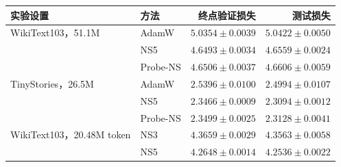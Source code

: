 \begin{tabular}{llrr}
\toprule
实验设置 & 方法 & 终点验证损失 & 测试损失 \\ \midrule
WikiText103，51.1M & AdamW & $5.0354\pm0.0039$ & $5.0422\pm0.0050$ \\
 & NS5 & $4.6493\pm0.0034$ & $4.6559\pm0.0024$ \\
 & Probe-NS & $4.6506\pm0.0037$ & $4.6606\pm0.0059$ \\
\addlinespace
TinyStories，26.5M & AdamW & $2.5396\pm0.0100$ & $2.4994\pm0.0107$ \\
 & NS5 & $2.3466\pm0.0009$ & $2.3094\pm0.0012$ \\
 & Probe-NS & $2.3499\pm0.0025$ & $2.3128\pm0.0041$ \\
\addlinespace
WikiText103，20.48M token & NS3 & $4.3659\pm0.0029$ & $4.3563\pm0.0058$ \\
 & NS5 & $4.2648\pm0.0014$ & $4.2536\pm0.0022$ \\
\bottomrule
\end{tabular}
